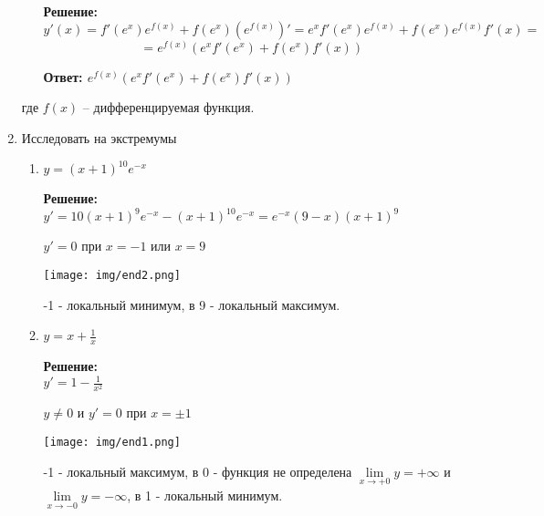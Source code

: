 \documentclass[a4paper,12pt]{article}
\begin{document}
\begin{enumerate}
\begin{enumerate}
\textbf{Решение:} \\
$$y'(x) =f'(e^x) e^{f(x)}+f(e^x) (e^{f(x)})'= e^x f'(e^x) e^{f(x)}+f(e^x) e^{f(x)} f'(x) = $$
$$=e^{f(x)}(e^x f'(e^x)+f(e^x)f'(x))$$


\textbf{Ответ: $e^{f(x)}(e^x f'(e^x)+f(e^x)f'(x))$}

\end{enumerate}
где $f(x)$ -- дифференцируемая функция.


\item Исследовать на экстремумы
\begin{enumerate}
\item $y = (x+1)^{10}e^{-x}$


\textbf{Решение:} \\

$y' = 10(x+1)^{9}e^{-x} -(x+1)^{10}e^{-x}=e^{-x} ( 9-x) ( x+1)^9$

$y' = 0$ при $x = -1$ или $x = 9$

\centerline{\texttt{[image: img/end2.png]}}

-1 - локальный минимум, в 9 - локальный максимум.

\item $y = x + \frac{1}{x}$

\textbf{Решение:} \\
$y' = 1 - \frac{1}{x^2}$

$y \neq 0$ и $y' = 0$ при $x=\pm1$

\centerline{\texttt{[image: img/end1.png]}}

-1 - локальный максимум, в 0 - функция не определена $
\lim\limits_{x\to +0}y = +\infty
$ и $
\lim\limits_{x\to -0}y = -\infty
$, в 1 - локальный минимум.

\end{enumerate}

\end{enumerate}
\end{document}
